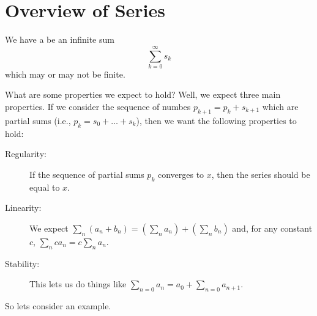 
\section{Overview of Series}
\begin{defn}
We have a  be an infinite sum
\begin{equation}
\sum^{\infty}_{k=0}s_{k}
\end{equation}
which may or may not be finite. 
\end{defn}

What are some properties we expect to hold? Well, we expect three
main properties. If we consider the sequence of numbes
$p_{k+1}=p_{k}+s_{k+1}$ which are partial sums (i.e.,
$p_{k}=s_{0}+\dots+s_{k}$), then we want the following properties
to hold:
\begin{description}
\item[Regularity:] If the sequence of partial sums $p_{k}$
  converges to $x$, then the series should be equal to $x$.
\item[Linearity:] We expect
  $\sum_{n}(a_{n}+b_{n})=(\sum_{n}a_{n})+(\sum_{n}b_{n})$ and,
  for any constant $c$, $\sum_{n}ca_{n}=c\sum_{n}a_{n}$.
\item[Stability:] This lets us do things like
  $\sum_{n=0}a_{n}=a_{0}+\sum_{n=0}a_{n+1}$. 
\end{description}
So lets consider an example.

